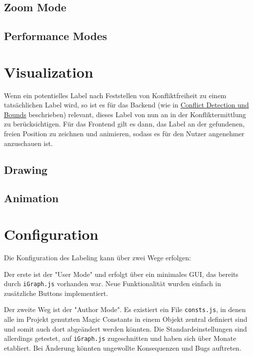 \documentclass[final,nopreprintline]{elsarticle}
\begin{document}
\subsection{Zoom Mode}
\label{subsec:zoom}
    

\subsection{Performance Modes}
\label{subsec:perf}
    


\section{Visualization}
\label{sec:visualization}
Wenn ein potentielles Label nach Feststellen von Konfliktfreiheit zu einem tatsächlichen Label wird, so ist es für das Backend (wie in \hyperref[sec:conflict]{Conflict Detection und Bounds} beschrieben) relevant, dieses Label von nun an in der Konfliktermittlung zu berücksichtigen.
Für das Frontend gilt es dann, das Label an der gefundenen, freien Position zu zeichnen und animieren, sodass es für den Nutzer angenehmer anzuschauen ist.


\subsection{Drawing}
\label{subsec:draw}
    

\subsection{Animation}
\label{subsec:animate}
    


\section{Configuration}
\label{sec:configuration}

Die Konfiguration des Labeling kann über zwei Wege erfolgen:

Der erste ist der "User Mode" und erfolgt über ein minimales GUI, das bereits durch \texttt{iGraph.js} vorhanden war.
Neue Funktionalität wurden einfach in zusätzliche Buttons implementiert.

Der zweite Weg ist der "Author Mode". Es existiert ein File \texttt{consts.js}, in denen alle im Projekt
genutzten Magic Constants in einem Objekt zentral definiert sind und somit auch dort abgeändert werden könnten.
Die Standardeinstellungen sind allerdings getestet, auf \texttt{iGraph.js} zugeschnitten und haben sich über Monate etabliert.
Bei Änderung könnten ungewollte Konsequenzen und Bugs auftreten.
\end{document}
